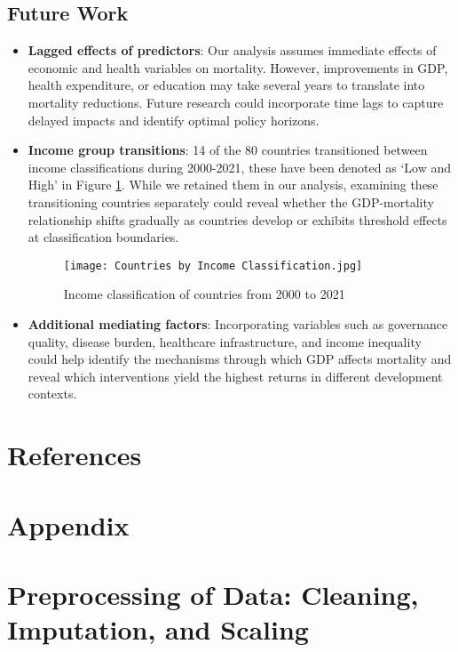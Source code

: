 \documentclass[10pt,a4paper]{article}
\begin{document}
\subsection{Future Work}
\begin{itemize}
\item \textbf{Lagged effects of predictors}: Our analysis assumes immediate effects of economic and health variables on mortality. However, improvements in GDP, health expenditure, or education may take several years to translate into mortality reductions. Future research could incorporate time lags to capture delayed impacts and identify optimal policy horizons.

\item \textbf{Income group transitions}: 14 of the 80 countries transitioned between income classifications during 2000-2021, these have been denoted as `Low and High' in Figure \ref{fig:income_classification}. While we retained them in our analysis, examining these transitioning countries separately could reveal whether the GDP-mortality relationship shifts gradually as countries develop or exhibits threshold effects at classification boundaries.

    \begin{figure}[H]
    	\centering
    	\texttt{[image: Countries by Income Classification.jpg]}
    	\caption{Income classification of countries from 2000 to 2021}
    	\label{fig:income_classification}
    \end{figure}

\item \textbf{Additional mediating factors}: Incorporating variables such as governance quality, disease burden, healthcare infrastructure, and income inequality could help identify the mechanisms through which GDP affects mortality and reveal which interventions yield the highest returns in different development contexts.
\end{itemize}

\newpage
\section{References}
\printbibliography[heading=none]
	
\newpage
\section{Appendix}
\appendix
    \section{Preprocessing of Data: Cleaning, Imputation, and Scaling }
\end{document}
